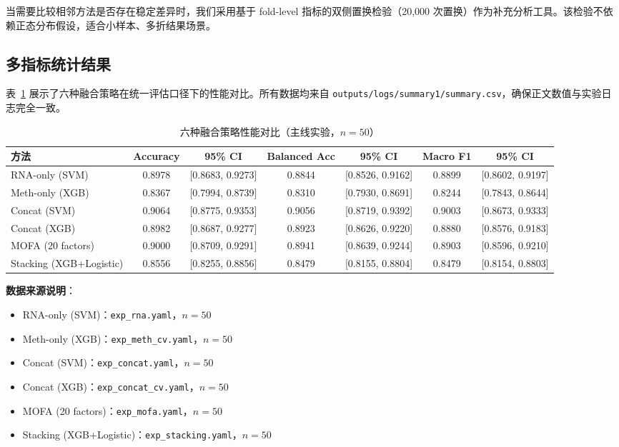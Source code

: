 当需要比较相邻方法是否存在稳定差异时，我们采用基于 fold-level 指标的双侧置换检验（20,000 次置换）作为补充分析工具。该检验不依赖正态分布假设，适合小样本、多折结果场景。

\subsection{多指标统计结果}

表~\ref{tab:results-main} 展示了六种融合策略在统一评估口径下的性能对比。所有数据均来自 \texttt{outputs/logs/summary1/summary.csv}，确保正文数值与实验日志完全一致。

\begin{table}[H]
\centering
\caption{六种融合策略性能对比（主线实验，$n=50$）}
\label{tab:results-main}
\begin{tabular}{lcccccc}
\toprule
方法 & Accuracy & 95\% CI & Balanced Acc & 95\% CI & Macro F1 & 95\% CI \\
\midrule
RNA-only (SVM) & 0.8978 & [0.8683, 0.9273] & 0.8844 & [0.8526, 0.9162] & 0.8899 & [0.8602, 0.9197] \\
Meth-only (XGB) & 0.8367 & [0.7994, 0.8739] & 0.8310 & [0.7930, 0.8691] & 0.8244 & [0.7843, 0.8644] \\
Concat (SVM) & 0.9064 & [0.8775, 0.9353] & 0.9056 & [0.8719, 0.9392] & 0.9003 & [0.8673, 0.9333] \\
Concat (XGB) & 0.8982 & [0.8687, 0.9277] & 0.8923 & [0.8626, 0.9220] & 0.8880 & [0.8576, 0.9183] \\
MOFA (20 factors) & 0.9000 & [0.8709, 0.9291] & 0.8941 & [0.8639, 0.9244] & 0.8903 & [0.8596, 0.9210] \\
Stacking (XGB+Logistic) & 0.8556 & [0.8255, 0.8856] & 0.8479 & [0.8155, 0.8804] & 0.8479 & [0.8154, 0.8803] \\
\bottomrule
\end{tabular}
\end{table}

\textbf{数据来源说明}：
\begin{itemize}
    \item RNA-only (SVM)：\texttt{exp\_rna.yaml}，$n=50$
    \item Meth-only (XGB)：\texttt{exp\_meth\_cv.yaml}，$n=50$
    \item Concat (SVM)：\texttt{exp\_concat.yaml}，$n=50$
    \item Concat (XGB)：\texttt{exp\_concat\_cv.yaml}，$n=50$
    \item MOFA (20 factors)：\texttt{exp\_mofa.yaml}，$n=50$
    \item Stacking (XGB+Logistic)：\texttt{exp\_stacking.yaml}，$n=50$
\end{itemize}

